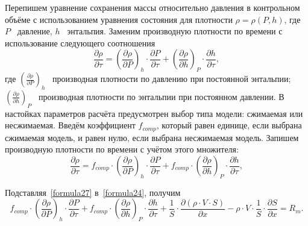 Перепишем уравнение сохранения массы относительно давления в контрольном объёме с использованием уравнения состояния для плотности $\rho=\rho(P,h)$, где $P$ \textthreequartersemdash\ давление, $h$ \textthreequartersemdash\ энтальпия. Заменим производную плотности по времени с использование следующего соотношения
\begin{equation}
\label{formula26}
\frac{\partial\rho}{\partial\tau}=\left(\frac{\partial\rho}{\partial P}\right)_{h}\cdot \frac{\partial P}{\partial\tau}+
\left(\frac{\partial\rho}{\partial h}\right)_{P}\cdot \frac{\partial h}{\partial\tau},
\end{equation}
где $\left(\frac{\partial\rho}{\partial P}\right)_{h}$ \textthreequartersemdash\ производная плотности по давлению при постоянной энтальпии; $\left(\frac{\partial\rho}{\partial h}\right)_{P}$ \textthreequartersemdash\ производная плотности по энтальпии при постоянном давлении. В настойках параметров расчёта предусмотрен выбор типа модели: сжимаемая или несжимаемая. Введём коэффициент $f_{comp}$, который равен единице, если выбрана сжимаемая модель, и равен нулю, если выбрана несжимаемая модель. Запишем производную плотности по времени с учётом этого множителя:
\begin{equation}
\label{formula27}
\frac{\partial\rho}{\partial\tau}=f_{comp}\cdot\left(\frac{\partial\rho}{\partial P}\right)_{h}\cdot \frac{\partial P}{\partial\tau}+
f_{comp}\cdot\left(\frac{\partial\rho}{\partial h}\right)_{P}\cdot \frac{\partial h}{\partial\tau},
\end{equation} 

Подставляя~\eqref{formula27} в~\eqref{formula24}, получим
\begin{equation}
\label{formula28}
f_{comp}\cdot\left(\frac{\partial\rho}{\partial P}\right)_{h}\cdot \frac{\partial P}{\partial\tau}+
f_{comp}\cdot\left(\frac{\partial\rho}{\partial h}\right)_{P}\cdot \frac{\partial h}{\partial\tau}+\frac 1 S \cdot \frac{\partial(\rho\cdot V\cdot S)}{\partial x}-\rho\cdot V \cdot \frac 1 S \cdot \frac{\partial S}{\partial x}=R_m.
\end{equation}


